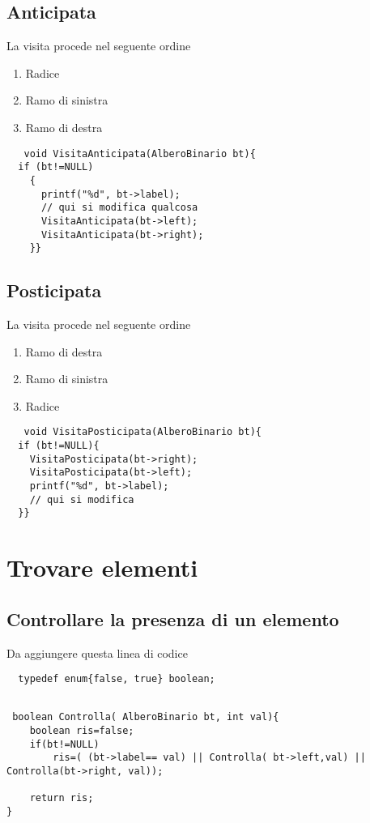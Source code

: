 \documentclass[a4paper,12pt,openany]{book}
\begin{document}
  \section{Anticipata}
   La visita procede nel seguente ordine 
  \begin{enumerate}
  \item Radice 
  \item Ramo di sinistra
  \item Ramo di destra
  \end{enumerate}
   \begin{lstlisting}
   void VisitaAnticipata(AlberoBinario bt){
  if (bt!=NULL)
    {
      printf("%d", bt->label);
      // qui si modifica qualcosa
      VisitaAnticipata(bt->left);
      VisitaAnticipata(bt->right);
    }}
 \end{lstlisting}

  \section{Posticipata}
   La visita procede nel seguente ordine 
  \begin{enumerate}
   \item Ramo di destra
    \item Ramo di sinistra
   \item Radice 
 \end{enumerate}
   \begin{lstlisting}
   void VisitaPosticipata(AlberoBinario bt){
  if (bt!=NULL){
    VisitaPosticipata(bt->right);
    VisitaPosticipata(bt->left);
    printf("%d", bt->label);
    // qui si modifica
  }}

 \end{lstlisting}
\chapter{Trovare elementi }
  \section{Controllare la presenza di un elemento}
  Da aggiungere questa linea di codice
 \begin{lstlisting}
  typedef enum{false, true} boolean;
  
 \end{lstlisting}
   \begin{lstlisting}
 boolean Controlla( AlberoBinario bt, int val){
    boolean ris=false;
    if(bt!=NULL)
        ris=( (bt->label== val) || Controlla( bt->left,val) || Controlla(bt->right, val));
    
    return ris;
}


 \end{lstlisting}
 \newpage
\end{document}
